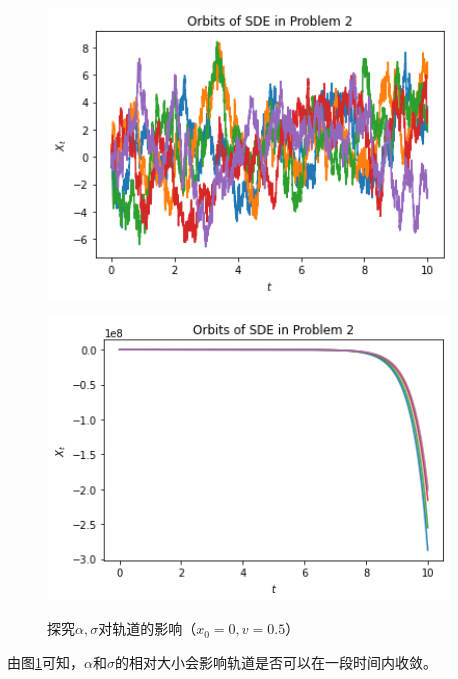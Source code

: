 \documentclass{article}
\begin{document}
\begin{figure}[H]
\begin{minipage}[c]{0.45\textwidth}
    \end{minipage}
    \begin{minipage}[c]{0.45\textwidth}
        \centering
        \includegraphics[width=0.95\textwidth]{figures/SDE1 Orbit5.png}
        \label{fig:SDE1ab-c}
    \end{minipage}
    \begin{minipage}[c]{0.45\textwidth}
        \centering
        \includegraphics[width=0.95\textwidth]{figures/SDE1 Orbit6.png}
        \label{fig:SDE1ab-d}
    \end{minipage}
    \caption{探究$\alpha, \sigma$对轨道的影响（$x_0 = 0, v = 0.5$）}
    \label{fig:SDE1ab}
\end{figure}

由图\ref{fig:SDE1ab}可知，$\alpha$和$\sigma$的相对大小会影响轨道是否可以在一段时间内收敛。
\end{document}

